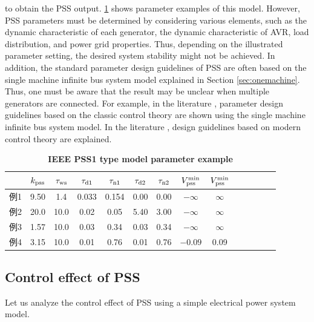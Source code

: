 \documentclass[graybox, envcountchap]{svmult}
\begin{document}
to obtain the PSS output.
\ref{table:psspara} shows parameter examples of this model.
However, PSS parameters must be determined by considering various elements, such as the dynamic characteristic of each generator, the dynamic characteristic of AVR, load distribution, and power grid properties.
Thus, depending on the illustrated parameter setting, the desired system stability might not be achieved.
In addition, the standard parameter design guidelines of PSS are often based on the single machine infinite bus system model explained in Section \ref{sec:onemachine}.
Thus, one must be aware that the result may be unclear when multiple generators are connected.
For example, in the literature \cite[Section 12.5]{kundur1994power}, parameter design guidelines based on the classic control theory are shown using the single machine infinite bus system model.
In the literature \cite{chow2004power}, design guidelines based on modern control theory are explained.

\begin{table}[h]
\medskip
 \caption{\textbf{IEEE PSS1 type model parameter example}}
 \label{table:psspara}
 \centering
  \begin{tabular}{lccccccccccccc}
   \hline
 &  $k_{\rm pss}$ & $\tau_{\rm ws}$ & $\tau_{{\rm d}1}$ & $\tau_{{\rm n}1}$ & $\tau_{{\rm d}2}$ & $\tau_{{\rm n}2}$ & $V_{\rm pss}^{\rm min}$ & $V_{\rm pss}^{\rm min}$ \\
   \hline \hline
   例1 \cite[12.5節]{kundur1994power}& 9.50 & 1.4 & 0.033 & 0.154 & 0.00 & 0.00 & $-\infty$ & $\infty$ \\
   例2 \cite[12.8節]{kundur1994power}& 20.0 & 10.0 & 0.02 & 0.05 & 5.40 & 3.00 & $-\infty$ & $\infty$ \\
   例3 \cite[III節]{chow2004power}& 1.57 & 10.0 & 0.03 & 0.34 & 0.03 & 0.34 & $-\infty$ & $\infty$ \\
   例4 \cite[Table H.3]{ieee2016ieee}& 3.15 & 10.0 & 0.01 & 0.76 & 0.01 & 0.76 & $-0.09$ & 0.09\\
   \hline
  \end{tabular}
\end{table}

\subsection{Control effect of PSS}\label{sec:pssov}

Let us analyze the control effect of PSS using a simple electrical power system model.
\end{document}
